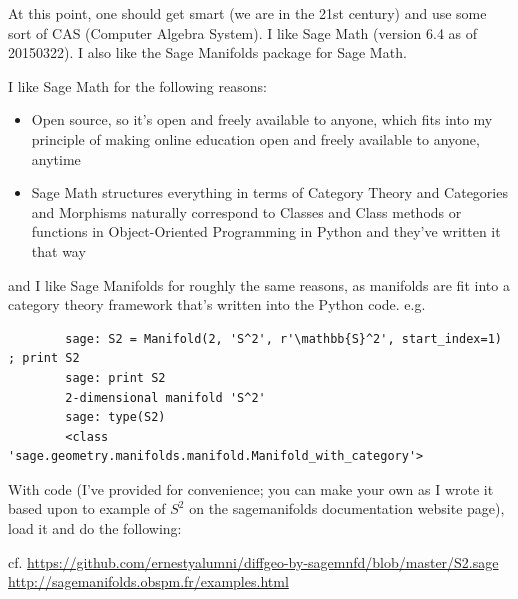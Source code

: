 	At this point, one should get smart (we are in the 21st century) and use some sort of CAS (Computer Algebra System). I like Sage Math (version 6.4 as of 20150322).  I also like the Sage Manifolds package for Sage Math.  
	
	I like Sage Math for the following reasons:
	\begin{itemize}
		\item Open source, so it’s open and freely available to anyone, which fits into my principle of making online education open and freely available to anyone, anytime
		\item Sage Math structures everything in terms of Category Theory and Categories and Morphisms naturally correspond to Classes and Class methods or functions in Object-Oriented Programming in Python and they’ve written it that way
	\end{itemize}
	and I like Sage Manifolds for roughly the same reasons, as manifolds are fit into a category theory framework that’s written into the Python code.  e.g.
	
	{\small \begin{verbatim}
		sage: S2 = Manifold(2, 'S^2', r'\mathbb{S}^2', start_index=1) ; print S2
		sage: print S2
		2-dimensional manifold 'S^2'
		sage: type(S2)
		<class 'sage.geometry.manifolds.manifold.Manifold_with_category'>
		\end{verbatim}}
	
	With code (I’ve provided for convenience; you can make your own as I wrote it based upon to example of $S^2$ on the sagemanifolds documentation website page), load it and do the following:
	
	cf. \url{https://github.com/ernestyalumni/diffgeo-by-sagemnfd/blob/master/S2.sage} \\
	\url{http://sagemanifolds.obspm.fr/examples.html}
	
